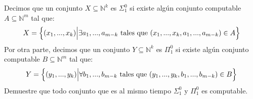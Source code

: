 \documentclass[12pt]{report}
\theoremstyle{largebreak}
\begin{document}
    \begin{excer}
        Decimos que un conjunto $X\subseteq\mathbb{N}^k$ es $\Sigma_1^0$ si existe algún conjunto computable $A\subseteq\mathbb{N}^m$ tal que:
        \begin{equation*}
            X=\left\{(x_1,...,x_k)\Big|\exists a_1,...,a_{ m-k}\textup{ tales que }(x_1,...,x_k,a_1,...,a_{m-k})\in A\right\}
        \end{equation*}
        Por otra parte, decimos que un conjunto $Y\subseteq\mathbb{N}^k$ es $\Pi_1^0$ si existe algún conjunto computable $B\subseteq\mathbb{N}^m$ tal que:
        \begin{equation*}
            Y=\left\{(y_1,...,y_k)\Big|\forall b_1,...,b_{ m-k}\textup{ tales que }(y_1,...,y_k,b_1,...,b_{m-k})\in B\right\}
        \end{equation*}
        Demuestre que todo conjunto que es al mismo tiempo $\Sigma_1^0$ y $\Pi_1^0$ es computable.
    \end{excer}
\end{document}
